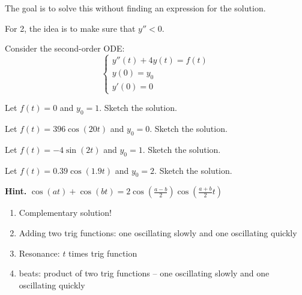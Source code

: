 \begin{annotation}
\begin{goals}
	The goal is to solve this without finding an expression for the solution.
	
	For 2, the idea is to make sure that $y''<0$. 
\end{goals}	
\end{annotation}

	

\bookonlynewpage

\question	
	Consider the second-order ODE:
	$$
	\begin{cases}
	y''(t) +4 y(t) = f(t) \\
	y(0)=y_0\\
	y'(0)=0
	\end{cases}
	$$
	
	\begin{parts}
		\item Let $f(t)=0$ and $y_0=1$. Sketch the solution.
		\item Let $f(t)= 396\cos(20t)$ and $y_0=0$. Sketch the solution.

		\item Let $f(t) = -4\sin(2t)$ and $y_0=1$. Sketch the solution.

		\item Let $f(t) = 0.39\cos(1.9t)$ and $y_0=2$. Sketch the solution.
		
		\textbf{Hint. } $\displaystyle \cos(at) + \cos(bt) = 2 \cos\left( \frac{a-b}{2} \right)  \cos\left(\frac{a+b}{2} t \right)$
	\end{parts}

\begin{annotation}
\begin{goals}
	\begin{enumerate}
		\item Complementary solution!
		\item Adding two trig functions: one oscillating slowly and one oscillating quickly
		\item Resonance: $t$ times trig function
		\item beats: product of two trig functions -- one oscillating slowly and one oscillating quickly
	\end{enumerate}
\end{goals}	
\end{annotation}


\standardonlynewpage
